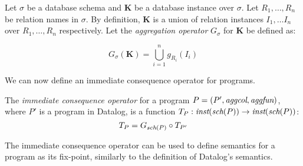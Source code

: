 \begin{defn}
Let $\sigma$ be a database schema and $\textbf{K}$ be a database instance over $\sigma$. Let $R_1, \dots, R_n$ be relation names in $\sigma$. By definition, $\textbf{K}$ is a union of relation instances $I_1, \dots I_n$ over $R_1, \dots, R_n$ respectively. %
Let the \emph{aggregation operator} $G_\sigma$ for $\textbf{K}$ be defined as:

$$G_\sigma(\textbf{K}) = \bigcup_{i = 1}^n g_{R_i}(I_i)$$

\end{defn}

We can now define an immediate consequence operator for \datalogra programs.

\begin{defn}
The \emph{immediate consequence operator} for a \datalogra program $P = (P', \textit{aggcol}, \textit{aggfun})$, where $P'$ is a program in Datalog, is a function $T_P: \textit{inst}(\textit{sch}(P)) \to \textit{inst}(\textit{sch}(P))$:
$$T_P = G_{\textit{sch}(P)} \circ T_{P'}$$
\end{defn}

The immediate consequence operator can be used to define semantics for a \datalogra program as its fix-point, similarly to the definition of Datalog's semantics.

